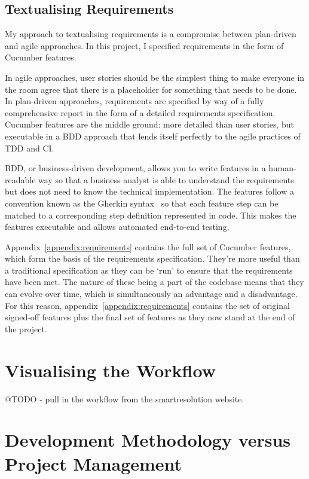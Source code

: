 \subsection{Textualising Requirements}

My approach to textualising requirements is a compromise between plan-driven and agile approaches. In this project, I specified requirements in the form of Cucumber features.

In agile approaches, user stories should be the simplest thing to make everyone in the room agree that there is a placeholder for something that needs to be done. In plan-driven approaches, requirements are specified by way of a fully comprehensive report in the form of a detailed requirements specification. Cucumber features are the middle ground: more detailed than user stories, but executable in a BDD approach that lends itself perfectly to the agile practices of TDD and CI.

BDD, or business-driven development, allows you to write features in a human-readable way so that a business analyst is able to understand the requirements but does not need to know the technical implementation. The features follow a convention known as the Gherkin syntax~\cite{gherkin} so that each feature step can be matched to a corresponding step definition represented in code. This makes the features executable and allows automated end-to-end testing.

Appendix~\ref{appendix:requirements} contains the full set of Cucumber features, which form the basis of the requirements specification. They're more useful than a traditional specification as they can be `run' to ensure that the requirements have been met. The nature of these being a part of the codebase means that they can evolve over time, which is simultaneously an advantage and a disadvantage. For this reason, appendix~\ref{appendix:requirements} contains the set of original signed-off features plus the final set of features as they now stand at the end of the project.

\section{Visualising the Workflow}

@TODO - pull in the workflow from the smartresolution website.

\section{Development Methodology versus Project Management}

